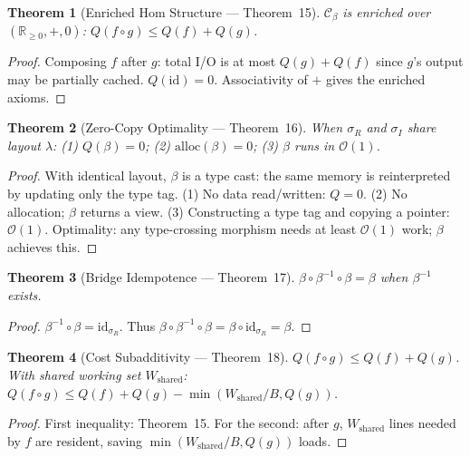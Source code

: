 \documentclass{article}
\newtheorem{theorem}{Theorem}
\theoremstyle{definition}
\theoremstyle{remark}
\newcommand{\BigO}{\mathcal{O}}
\begin{document}
\begin{theorem}[Enriched Hom Structure --- Theorem~15]\label{thm:enriched}
$\mathcal{C}_\beta$ is enriched over $(\mathbb{R}_{\geq 0}, +, 0)$: $Q(f \circ g) \leq Q(f) + Q(g)$.
\end{theorem}

\begin{proof}
Composing $f$ after $g$: total I/O is at most $Q(g) + Q(f)$ since $g$'s output may be partially cached. $Q(\mathrm{id}) = 0$. Associativity of $+$ gives the enriched axioms.
\end{proof}

\begin{theorem}[Zero-Copy Optimality --- Theorem~16]\label{thm:zerocopy-app}
When $\sigma_R$ and $\sigma_I$ share layout $\lambda$: (1) $Q(\beta) = 0$; (2) $\mathrm{alloc}(\beta) = 0$; (3) $\beta$ runs in $\BigO(1)$.
\end{theorem}

\begin{proof}
With identical layout, $\beta$ is a type cast: the same memory is reinterpreted by updating only the type tag.
(1) No data read/written: $Q = 0$.
(2) No allocation; $\beta$ returns a view.
(3) Constructing a type tag and copying a pointer: $\BigO(1)$.
Optimality: any type-crossing morphism needs at least $\BigO(1)$ work; $\beta$ achieves this.
\end{proof}

\begin{theorem}[Bridge Idempotence --- Theorem~17]\label{thm:idempotence}
$\beta \circ \beta^{-1} \circ \beta = \beta$ when $\beta^{-1}$ exists.
\end{theorem}

\begin{proof}
$\beta^{-1} \circ \beta = \mathrm{id}_{\sigma_R}$. Thus $\beta \circ \beta^{-1} \circ \beta = \beta \circ \mathrm{id}_{\sigma_R} = \beta$.
\end{proof}

\begin{theorem}[Cost Subadditivity --- Theorem~18]\label{thm:subadditivity}
$Q(f \circ g) \leq Q(f) + Q(g)$. With shared working set $W_{\mathrm{shared}}$:
$Q(f \circ g) \leq Q(f) + Q(g) - \min(W_{\mathrm{shared}}/B, Q(g))$.
\end{theorem}

\begin{proof}
First inequality: Theorem~15. For the second: after $g$, $W_{\mathrm{shared}}$ lines needed by $f$ are resident, saving $\min(W_{\mathrm{shared}}/B, Q(g))$ loads.
\end{proof}
\end{document}
